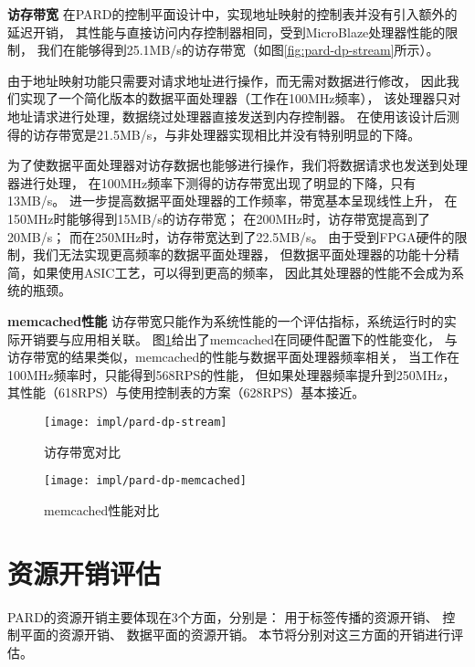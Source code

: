 \textbf{访存带宽}\quad
在PARD的控制平面设计中，实现地址映射的控制表并没有引入额外的延迟开销，
其性能与直接访问内存控制器相同，受到MicroBlaze处理器性能的限制，
我们在能够得到25.1MB/s的访存带宽（如图\ref{fig:pard-dp-stream}所示）。

由于地址映射功能只需要对请求地址进行操作，而无需对数据进行修改，
因此我们实现了一个简化版本的数据平面处理器（工作在100MHz频率），
该处理器只对地址请求进行处理，数据绕过处理器直接发送到内存控制器。
在使用该设计后测得的访存带宽是21.5MB/s，与非处理器实现相比并没有特别明显的下降。

为了使数据平面处理器对访存数据也能够进行操作，我们将数据请求也发送到处理器进行处理，
在100MHz频率下测得的访存带宽出现了明显的下降，只有13MB/s。
进一步提高数据平面处理器的工作频率，带宽基本呈现线性上升，
在150MHz时能够得到15MB/s的访存带宽；
在200MHz时，访存带宽提高到了20MB/s；
而在250MHz时，访存带宽达到了22.5MB/s。
由于受到FPGA硬件的限制，我们无法实现更高频率的数据平面处理器，
但数据平面处理器的功能十分精简，如果使用ASIC工艺，可以得到更高的频率，
因此其处理器的性能不会成为系统的瓶颈。

\textbf{memcached性能}\quad
访存带宽只能作为系统性能的一个评估指标，系统运行时的实际开销要与应用相关联。
图\ref{fig:pard-dp-memcached}给出了memcached在同硬件配置下的性能变化，
与访存带宽的结果类似，memcached的性能与数据平面处理器频率相关，
当工作在100MHz频率时，只能得到568RPS的性能，
但如果处理器频率提升到250MHz，其性能（618RPS）与使用控制表的方案（628RPS）基本接近。

\begin{figure}[tb]
\begin{minipage}{0.48\textwidth}
  \centering
  \texttt{[image: impl/pard-dp-stream]}
  \caption{访存带宽对比}
  \label{fig:pard-dp-stream}
\end{minipage}\hfill
\begin{minipage}{0.48\textwidth}
  \centering
  \texttt{[image: impl/pard-dp-memcached]}
  \caption{memcached性能对比}
  \label{fig:pard-dp-memcached}
\end{minipage}
\end{figure}


\section{资源开销评估}

PARD的资源开销主要体现在3个方面，分别是：
用于标签传播的资源开销、
控制平面的资源开销、
数据平面的资源开销。
本节将分别对这三方面的开销进行评估。

